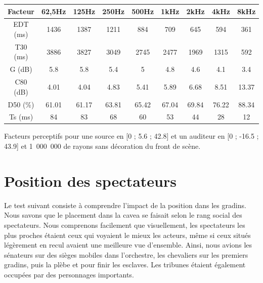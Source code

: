 \begin{tableth} 
 \begin{tabular}{| *{9}{c|}} 
 \hline 
 Facteur & 62,5Hz & 125Hz & 250Hz & 500Hz & 1kHz & 2kHz & 4kHz & 8kHz \\ 
 \hline 
 \hline 
\gls{EDT} (ms)& 1436& 1387& 1211& 884& 709& 645& 594& 361 \\ 
 \hline 
\gls{T30} (ms)& 3886& 3827& 3049& 2745& 2477& 1969& 1315& 592 \\ 
 \hline 
\gls{G} (dB)& 5.8& 5.8& 5.4& 5& 4.8& 4.6& 4.1& 3.4 \\ 
 \hline 
\gls{C80} (dB)& 4.01& 4.04& 4.83& 5.41& 5.89& 6.68& 8.51& 13.37 \\ 
 \hline 
\gls{D50} (\%)& 61.01& 61.17& 63.81& 65.42& 67.04& 69.84& 76.22& 88.34 \\ 
 \hline 
\gls{Ts} (ms)& 84& 83& 68& 60& 53& 44& 28& 12 \\ 
 \hline 
\end{tabular} 
 \caption{Facteurs perceptifs pour une source en [0 ; 5.6 ; 42.8] et un auditeur en [0 ; -16.5 ; 43.9] et 1~000~000 de rayons sans décoration du front de scène.} 
 \label{tab_fact_sansdec} 
 \end{tableth}


\section{Position des spectateurs} \label{sect_positionSpectateur}
Le test suivant consiste à comprendre l'impact de la position dans les gradins. Nous savons que le placement dans la \gls{cavea} se faisait selon le rang social des spectateurs. Nous comprenons facilement que visuellement, les spectateurs les plus proches étaient ceux qui voyaient le mieux les acteurs, même si ceux situés légèrement en recul avaient une meilleure vue d'ensemble. Ainsi, nous avions les sénateurs sur des sièges mobiles dans l'orchestre, les chevaliers sur les premiers gradins, puis la plèbe et pour finir les esclaves. Les tribunes étaient également occupées par des personnages importants.

